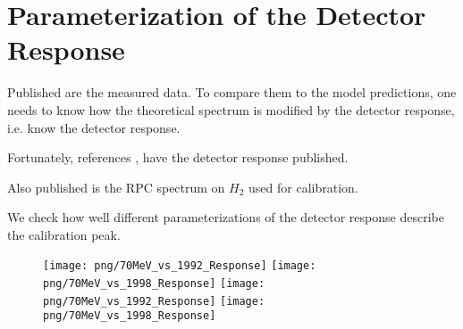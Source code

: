 \section { Parameterization of the Detector Response}


Published are the measured data. To compare them to the model predictions,
one needs to know how the theoretical spectrum is modified by the detector
response, i.e. know the detector response.

Fortunately, references  \cite{RMC_1992_PhysRevC.46.1094}, \cite{RMC_1999_PhysRevC.59.2853}
have the detector response published.

Also published is the RPC spectrum on $H_2$ used for calibration.

We check how well different parameterizations of the detector response describe the
calibration peak.
\begin{figure}[htbp]
 \begin{center}
 \texttt{[image: png/70MeV\_vs\_1992\_Response]} 
 \texttt{[image: png/70MeV\_vs\_1998\_Response]} 
 \texttt{[image: png/70MeV\_vs\_1992\_Response]} 
 \texttt{[image: png/70MeV\_vs\_1998\_Response]} 
 \end{center}
 \caption{}
 \label{p004}
 \end{figure}
